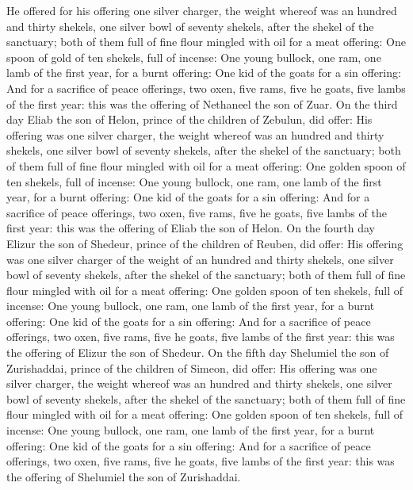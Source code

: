 \begin{biblechapter}
\verse He offered for his offering one silver charger, the weight whereof was an hundred and thirty shekels, one silver bowl of seventy shekels, after the shekel of the sanctuary; both of them full of fine flour mingled with oil for a meat offering:
\verse One spoon of gold of ten shekels, full of incense:
\verse One young bullock, one ram, one lamb of the first year, for a burnt offering:
\verse One kid of the goats for a sin offering:
\verse And for a sacrifice of peace offerings, two oxen, five rams, five he goats, five lambs of the first year: this was the offering of Nethaneel the son of Zuar.
\verse On the third day Eliab the son of Helon, prince of the children of Zebulun, did offer:
\verse His offering was one silver charger, the weight whereof was an hundred and thirty shekels, one silver bowl of seventy shekels, after the shekel of the sanctuary; both of them full of fine flour mingled with oil for a meat offering:
\verse One golden spoon of ten shekels, full of incense:
\verse One young bullock, one ram, one lamb of the first year, for a burnt offering:
\verse One kid of the goats for a sin offering:
\verse And for a sacrifice of peace offerings, two oxen, five rams, five he goats, five lambs of the first year: this was the offering of Eliab the son of Helon.
\verse On the fourth day Elizur the son of Shedeur, prince of the children of Reuben, did offer:
\verse His offering was one silver charger of the weight of an hundred and thirty shekels, one silver bowl of seventy shekels, after the shekel of the sanctuary; both of them full of fine flour mingled with oil for a meat offering:
\verse One golden spoon of ten shekels, full of incense:
\verse One young bullock, one ram, one lamb of the first year, for a burnt offering:
\verse One kid of the goats for a sin offering:
\verse And for a sacrifice of peace offerings, two oxen, five rams, five he goats, five lambs of the first year: this was the offering of Elizur the son of Shedeur.
\verse On the fifth day Shelumiel the son of Zurishaddai, prince of the children of Simeon, did offer:
\verse His offering was one silver charger, the weight whereof was an hundred and thirty shekels, one silver bowl of seventy shekels, after the shekel of the sanctuary; both of them full of fine flour mingled with oil for a meat offering:
\verse One golden spoon of ten shekels, full of incense:
\verse One young bullock, one ram, one lamb of the first year, for a burnt offering:
\verse One kid of the goats for a sin offering:
\verse And for a sacrifice of peace offerings, two oxen, five rams, five he goats, five lambs of the first year: this was the offering of Shelumiel the son of Zurishaddai.

\end{biblechapter}
